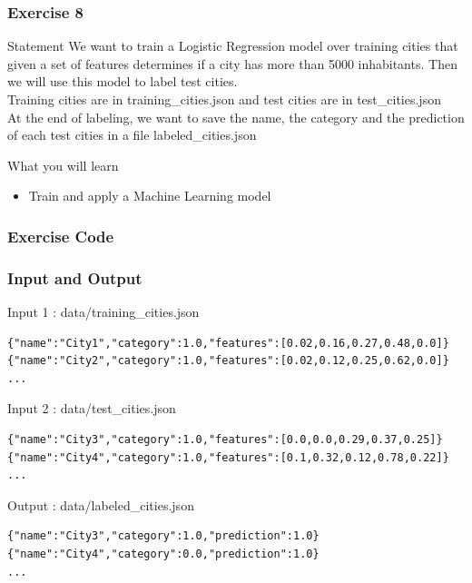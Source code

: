 \documentclass[slidetop,9pt,utf8]{beamer}
\begin{document}
\begin{frame}
  \frametitle{Exercise 8}

  \begin{block}{Statement}
    We want to train a Logistic Regression model over training cities that given a set of features determines if a city has more than 5000 inhabitants. Then we will use this model to label test cities. 
\\ \medskip
Training cities are in training\_cities.json and test cities are in test\_cities.json
\\ \medskip
At the end of labeling, we want to save the name, the category and the prediction of each test cities in a file labeled\_cities.json
  \end{block}

  \begin{block}{What you will learn}
    \begin{itemize}
      \item Train and apply a Machine Learning model
    \end{itemize}
  \end{block}

\end{frame}

\begin{frame}
  \frametitle{Exercise Code}

  

\end{frame}

\begin{frame}[fragile]

  \frametitle{Input and Output}
  
  \begin{block}{Input 1 : data/training\_cities.json}
    \begin{verbatim}
{"name":"City1","category":1.0,"features":[0.02,0.16,0.27,0.48,0.0]}
{"name":"City2","category":1.0,"features":[0.02,0.12,0.25,0.62,0.0]}
...
    \end{verbatim}
  \end{block}

  \begin{block}{Input 2 : data/test\_cities.json}
    \begin{verbatim}
{"name":"City3","category":1.0,"features":[0.0,0.0,0.29,0.37,0.25]}
{"name":"City4","category":1.0,"features":[0.1,0.32,0.12,0.78,0.22]}
...
    \end{verbatim}
  \end{block}

  \begin{block}{Output : data/labeled\_cities.json}
    \begin{verbatim}
{"name":"City3","category":1.0,"prediction":1.0}
{"name":"City4","category":0.0,"prediction":1.0}
...
    \end{verbatim}
  \end{block}

\end{frame}
\end{document}

